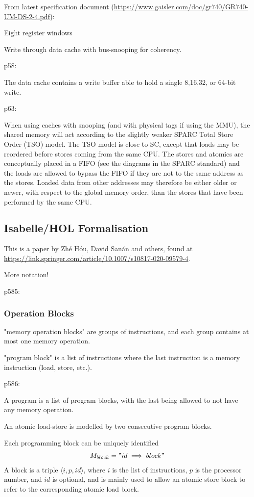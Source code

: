 From latest specification document
(\url{https://www.gaisler.com/doc/gr740/GR740-UM-DS-2-4.pdf}):

Eight register windows

Write through data cache with bus-snooping for coherency.

p58:

The data cache contains a write buffer
able to hold a single 8,16,32, or 64-bit write.

p63:

When using caches with snooping (and with physical tags if using the MMU),
the shared memory will act
according to the slightly weaker SPARC Total Store Order (TSO) model.
The TSO model is close to SC,
except that loads may be reordered before stores coming from the same CPU.
The stores and atomics are conceptually placed in a FIFO
(see the diagrams in the SPARC standard)
and the loads are allowed to bypass the FIFO
if they are not to the same address as the stores.
Loaded data from other addresses may therefore be either older or newer,
with respect to the global memory order,
than the stores that have been performed by the same CPU.


\subsection{Isabelle/HOL Formalisation}

This is a paper by Zh\'{e} H\'{o}u, David San\'{a}n and others,
found at \url{https://link.springer.com/article/10.1007/s10817-020-09579-4}.


More notation!

p585:

\subsubsection{Operation Blocks}

"memory operation blocks"
are groups of instructions,
and each group contains at most one memory operation.

"program block" is a list of instructions where the last instruction
is a memory instruction (load, store, etc.).

p586:

A program is a list of program blocks,
with the last being allowed to not have any memory operation.

An atomic load-store is modelled by two consecutive program blocks.

Each programming block can be uniquely identified
\begin{equation*}
  M_{block} = "id \implies block"
\end{equation*}
A block is a triple $\langle i,p,id \rangle$,
where $i$ is the list of instructions, $p$ is the processor number,
and $id$ is optional,
and is mainly used to allow an atomic store block
to refer to the corresponding atomic load block.


